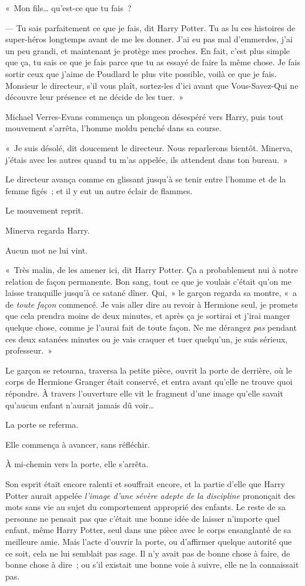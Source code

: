 «~Mon fils… qu'est-ce que tu fais~?

--- Tu sais parfaitement ce que je fais, dit Harry Potter. Tu as lu ces histoires de super-héros longtemps avant de me les donner. J'ai eu pas mal d'emmerdes, j'ai un peu grandi, et maintenant je protège mes proches. En fait, c'est plus simple que ça, tu sais ce que je fais parce que tu as essayé de faire la même chose. Je fais sortir ceux que j'aime de Poudlard le plus vite possible, voilà ce que je fais. Monsieur le directeur, s'il vous plaît, sortez-les d'ici avant que Vous-Savez-Qui ne découvre leur présence et ne décide de les tuer.~»

Michael Verres-Evans commença un plongeon désespéré vers Harry, puis tout mouvement s'arrêta, l'homme moldu penché dans sa course.

«~Je suis désolé, dit doucement le directeur. Nous reparlerons bientôt. Minerva, j'étais avec les autres quand tu m'as appelée, ils attendent dans ton bureau.~»

Le directeur avança comme en glissant jusqu'à se tenir entre l'homme et de la femme figés~; et il y eut un autre éclair de flammes.

Le mouvement reprit.

Minerva regarda Harry.

Aucun mot ne lui vint.

«~Très malin, de les amener ici, dit Harry Potter. Ça a probablement nui à notre relation de façon permanente. Bon sang, tout ce que je voulais c'était qu'on me laisse tranquille jusqu'à ce satané dîner. Qui,~» le garçon regarda sa montre, «~a de \emph{toute façon} commencé. Je vais aller dire au revoir à Hermione seul, je promets que cela prendra moins de deux minutes, et après ça je sortirai et j'irai manger quelque chose, comme je l'aurai fait de toute façon. Ne me dérangez \emph{pas} pendant ces deux satanées minutes ou je vais craquer et tuer quelqu'un, je suis sérieux, professeur.~»

Le garçon se retourna, traversa la petite pièce, ouvrit la porte de derrière, où le corps de Hermione Granger était conservé, et entra avant qu'elle ne trouve quoi répondre. À travers l'ouverture elle vit le fragment d'une image qu'elle savait qu'aucun enfant n'aurait jamais dû voir…

La porte se referma.

Elle commença à avancer, sans réfléchir.

À mi-chemin vers la porte, elle s'arrêta.

Son esprit était encore ralenti et souffrait encore, et la partie d'elle que Harry Potter aurait appelée \emph{l'image d'une sévère adepte de la discipline} prononçait des mots sans vie au sujet du comportement approprié des enfants. Le reste de sa personne ne pensait pas que c'était une bonne idée de laisser n'importe quel enfant, même Harry Potter, seul dans une pièce avec le corps ensanglanté de sa meilleure amie. Mais l'acte d'ouvrir la porte, ou d'affirmer quelque autorité que ce soit, cela ne lui semblait pas sage. Il n'y avait pas de bonne chose à faire, de bonne chose à dire~; ou s'il existait une bonne voie à suivre, elle ne la connaissait pas.

